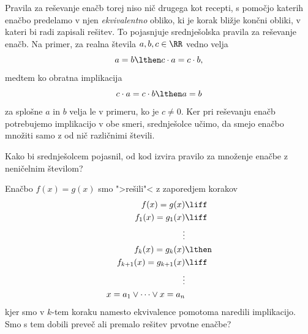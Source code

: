 Pravila za reševanje enačb torej niso nič drugega kot recepti, s
pomočjo katerih enačbo predelamo v njen \emph{ekvivalentno} obliko, ki
je korak bližje končni obliki, v kateri bi radi zapisali rešitev. To
pojasnjuje srednješolska pravila za reševanje enačb. Na primer, za
realna števila $a, b, c \in \RR$ vedno velja
%
\begin{equation*}
  a = b \lthen c \cdot a = c \cdot b,
\end{equation*}
%
medtem ko obratna implikacija
%
\begin{equation*}
  c \cdot a = c \cdot b \lthen a = b
\end{equation*}
%
za splošne $a$ in $b$ velja le v primeru, ko je $c \neq 0$. Ker pri
reševanju enačb potrebujemo implikacijo v obe smeri, srednješolce
učimo, da smejo enačbo množiti samo z od nič različnimi števili.

\begin{vaja}
  Kako bi srednješolcem pojasnil, od kod izvira pravilo za množenje
  enačbe z neničelnim številom?
\end{vaja}

\begin{vaja}
  Enačbo $f(x) = g(x)$ smo ">rešili"< z zaporedjem korakov
  \begin{align*}
    f(x) = g(x) &\liff \\
    f_1(x) = g_1(x) &\liff \\
    \vdots & \\
    f_k(x) = g_k(x) &\lthen \\
    f_{k+1}(x) = g_{k+1}(x) &\liff \\
    \vdots & \\
    x = a_1 \lor \cdots \lor x = a_n
  \end{align*}
  kjer smo v $k$-tem koraku namesto ekvivalence pomotoma naredili
  implikacijo. Smo s tem dobili preveč ali premalo rešitev prvotne
  enačbe?
\end{vaja}



